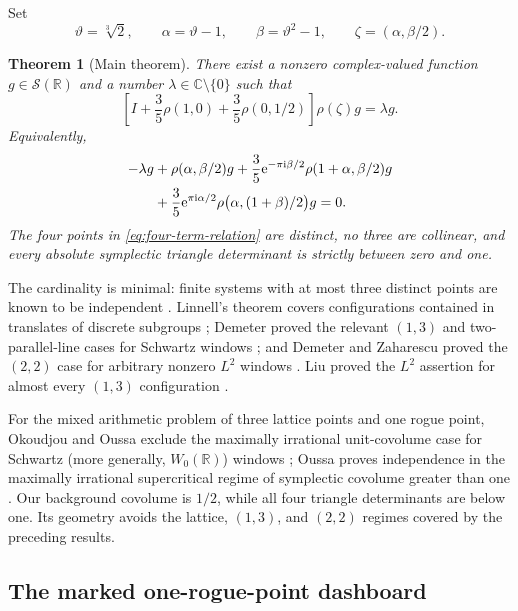 \documentclass[11pt,reqno]{amsart}
\numberwithin{equation}{section}
\newtheorem{theorem}{Theorem}[section]
\theoremstyle{definition}
\newcommand{\R}{\mathbb R}
\newcommand{\C}{\mathbb C}
\newcommand{\cS}{\mathcal S}
\newcommand{\e}{\mathrm e}
\newcommand{\ii}{\mathrm i}
\begin{document}
Set
\begin{equation}\label{eq:parameters}
 \vartheta=\sqrt[3]{2},\qquad
 \alpha=\vartheta-1,\qquad
 \beta=\vartheta^2-1,\qquad
 \zeta=(\alpha,\beta/2).
\end{equation}

\begin{theorem}[Main theorem]\label{thm:main}
There exist a nonzero complex-valued function $g\in\cS(\R)$ and a number
$\lambda\in\C\setminus\{0\}$ such that
\begin{equation}\label{eq:eigen-relation}
 \left[I+\frac35\rho(1,0)+\frac35\rho(0,1/2)\right]
 \rho(\zeta)g=\lambda g.
\end{equation}
Equivalently,
\begin{align}\label{eq:four-term-relation}
 -\lambda g
 &+\rho(\alpha,\beta/2)g
 +\frac35\e^{-\pi\ii\beta/2}\rho(1+\alpha,\beta/2)g \notag\\
 &+\frac35\e^{\pi\ii\alpha/2}
       \rho\bigl(\alpha,(1+\beta)/2\bigr)g=0.
\end{align}
The four points in \eqref{eq:four-term-relation} are distinct, no three are
collinear, and every absolute symplectic triangle determinant is strictly
between zero and one.
\end{theorem}

The cardinality is minimal: finite systems with at most three distinct points
are known to be independent \cite{HRT,heil2006linear}.
Linnell's theorem covers configurations contained in translates of discrete
subgroups \cite{Linnell}; Demeter proved the relevant $(1,3)$ and
two-parallel-line cases for Schwartz windows \cite{demeter2010linear}; and
Demeter and Zaharescu proved the $(2,2)$ case for arbitrary nonzero $L^2$
windows \cite{demeter2012proof}.  Liu proved the $L^2$ assertion for almost
every $(1,3)$ configuration \cite{Liu2019}.

For the mixed arithmetic problem of three lattice points and one rogue point,
Okoudjou and Oussa exclude the maximally irrational unit-covolume case for
Schwartz (more generally, $W_0(\R)$) windows
\cite{OkoudjouOussa2025}; Oussa proves independence in the maximally
irrational supercritical regime of symplectic covolume greater than one
\cite{Oussa2026}.  Our background covolume is $1/2$, while all four triangle
determinants are below one.  Its geometry avoids the lattice, $(1,3)$, and
$(2,2)$ regimes covered by the preceding results.

\subsection*{The marked one-rogue-point dashboard}
\end{document}
